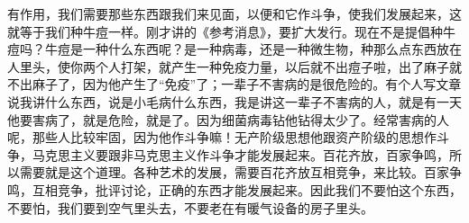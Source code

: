 有作用，我们需要那些东西跟我们来见面，以便和它作斗争，使我们发展起来，这就等于我们种牛痘一样。刚才讲的《参考消息》，要扩大发行。现在不是提倡种牛痘吗？牛痘是一种什么东西呢？是一种病毒，还是一种微生物，种那么点东西放在人里头，使你两个人打架，就产生一种免疫力量，以后就不出痘子啦，出了麻子就不出麻子了，因为他产生了“免疫”了；一辈子不害病的是很危险的。有个人写文章说我讲什么东西，说是小毛病什么东西，我是讲这一辈子不害病的人，就是有一天他要害病了，就是危险，就是了。因为细菌病毒钻他钻得太少了。经常害病的人呢，那些人比较牢固，因为他作斗争嘛！无产阶级思想他跟资产阶级的思想作斗争，马克思主义要跟非马克思主义作斗争才能发展起来。百花齐放，百家争鸣，所以需要就是这个道理。各种艺术的发展，需要百花齐放互相竞争，来比较。百家争鸣，互相竞争，批评讨论，正确的东西才能发展起来。因此我们不要怕这个东西，不要怕，我们要到空气里头去，不要老在有暖气设备的房子里头。


